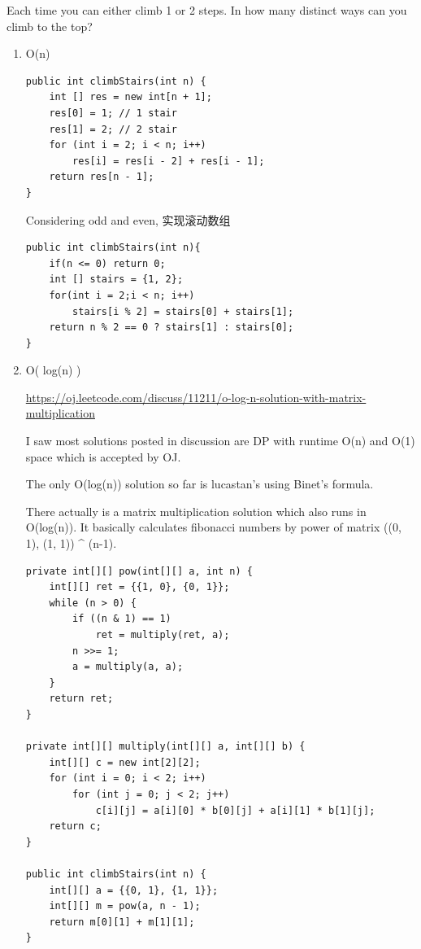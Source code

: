 \documentclass[11pt]{book}
\begin{document}
Each time you can either climb 1 or 2 steps. In how many distinct ways
can you climb to the top?
\begin{enumerate}
\item O(n)
\label{sec-14-1-1-1}
\lstset{language=java,label= ,caption= ,numbers=none}
\begin{lstlisting}
public int climbStairs(int n) {
    int [] res = new int[n + 1];
    res[0] = 1; // 1 stair
    res[1] = 2; // 2 stair
    for (int i = 2; i < n; i++) 
        res[i] = res[i - 2] + res[i - 1];
    return res[n - 1];
}
\end{lstlisting}
Considering odd and even, 实现滚动数组
\lstset{language=java,label= ,caption= ,numbers=none}
\begin{lstlisting}
public int climbStairs(int n){
    if(n <= 0) return 0;
    int [] stairs = {1, 2};
    for(int i = 2;i < n; i++)
        stairs[i % 2] = stairs[0] + stairs[1];
    return n % 2 == 0 ? stairs[1] : stairs[0];
}
\end{lstlisting}
\item O( log(n) )
\label{sec-14-1-1-2}

\url{https://oj.leetcode.com/discuss/11211/o-log-n-solution-with-matrix-multiplication}

I saw most solutions posted in discussion are DP with runtime O(n) and O(1) space which is accepted by OJ.

The only O(log(n)) solution so far is lucastan's using Binet's formula.

There actually is a matrix multiplication solution which also runs in O(log(n)). It basically calculates fibonacci numbers by power of matrix ((0, 1), (1, 1)) \^{} (n-1).

\lstset{language=java,label= ,caption= ,numbers=none}
\begin{lstlisting}
private int[][] pow(int[][] a, int n) {
    int[][] ret = {{1, 0}, {0, 1}};
    while (n > 0) {
        if ((n & 1) == 1) 
            ret = multiply(ret, a);
        n >>= 1;
        a = multiply(a, a);
    }
    return ret;
}

private int[][] multiply(int[][] a, int[][] b) {
    int[][] c = new int[2][2];
    for (int i = 0; i < 2; i++) 
        for (int j = 0; j < 2; j++) 
            c[i][j] = a[i][0] * b[0][j] + a[i][1] * b[1][j];
    return c;
}

public int climbStairs(int n) {
    int[][] a = {{0, 1}, {1, 1}};
    int[][] m = pow(a, n - 1);
    return m[0][1] + m[1][1];
}
\end{lstlisting}
\end{enumerate}
\end{document}
